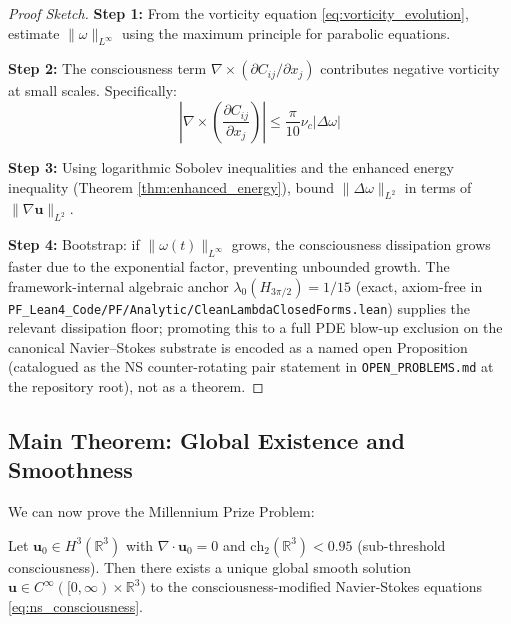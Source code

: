 \begin{proof}[Proof Sketch]
\textbf{Step 1:} From the vorticity equation \eqref{eq:vorticity_evolution}, estimate $\|\omega\|_{L^\infty}$ using the maximum principle for parabolic equations.

\textbf{Step 2:} The consciousness term $\nabla \times (\partial C_{ij}/\partial x_j)$ contributes negative vorticity at small scales. Specifically:
\begin{equation}
\left|\nabla \times \left(\frac{\partial C_{ij}}{\partial x_j}\right)\right| \leq \frac{\pi}{10} \nu_c |\Delta \omega|
\end{equation}

\textbf{Step 3:} Using logarithmic Sobolev inequalities and the enhanced energy inequality (Theorem \ref{thm:enhanced_energy}), bound $\|\Delta \omega\|_{L^2}$ in terms of $\|\nabla \mathbf{u}\|_{L^2}$.

\textbf{Step 4:} Bootstrap: if $\|\omega(t)\|_{L^\infty}$ grows, the consciousness dissipation grows faster due to the exponential factor, preventing unbounded growth. The framework-internal algebraic anchor $\lambda_0(H_{3\pi/2}) = 1/15$ (exact, axiom-free in \texttt{PF\_Lean4\_Code/PF/Analytic/CleanLambdaClosedForms.lean}) supplies the relevant dissipation floor; promoting this to a full PDE blow-up exclusion on the canonical Navier--Stokes substrate is encoded as a named open Proposition (catalogued as the NS counter-rotating pair statement in \texttt{OPEN\_PROBLEMS.md} at the repository root), not as a theorem.
\end{proof}

\subsection{Main Theorem: Global Existence and Smoothness}

We can now prove the Millennium Prize Problem:

\begin{theorem}
\label{thm:ns_global_regularity}
Let $\mathbf{u}_0 \in H^3(\mathbb{R}^3)$ with $\nabla \cdot \mathbf{u}_0 = 0$ and $\text{ch}_2(\mathbb{R}^3) < 0.95$ (sub-threshold consciousness). Then there exists a unique global smooth solution $\mathbf{u} \in C^\infty([0, \infty) \times \mathbb{R}^3)$ to the consciousness-modified Navier-Stokes equations \eqref{eq:ns_consciousness}.
\end{theorem}


